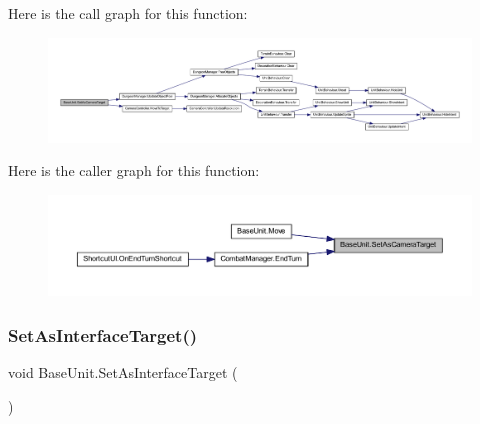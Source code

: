 Here is the call graph for this function\+:\nopagebreak
\begin{figure}[H]
\begin{center}
\leavevmode
\includegraphics[width=350pt]{class_base_unit_ac4b2eaeb4641fc124d36d413b6193c56_cgraph}
\end{center}
\end{figure}
Here is the caller graph for this function\+:\nopagebreak
\begin{figure}[H]
\begin{center}
\leavevmode
\includegraphics[width=350pt]{class_base_unit_ac4b2eaeb4641fc124d36d413b6193c56_icgraph}
\end{center}
\end{figure}
\mbox{\label{class_base_unit_abae0a52156648495ea6e8487782f8636}} 
\subsubsection{\texorpdfstring{SetAsInterfaceTarget()}{SetAsInterfaceTarget()}}
{\footnotesize\ttfamily void Base\+Unit.\+Set\+As\+Interface\+Target (\begin{DoxyParamCaption}{ }\end{DoxyParamCaption})}

